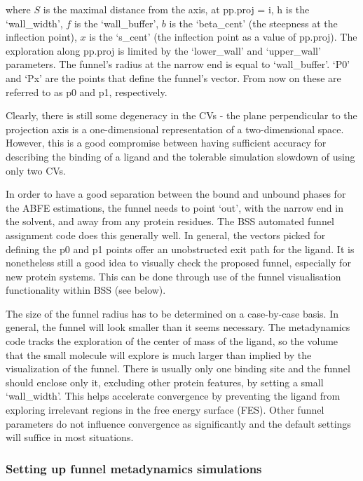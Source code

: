where $S$ is the maximal distance from the axis, at pp.proj = i, h is the
`wall\_width', $f$ is the `wall\_buffer', $b$ is the `beta\_cent' (the
steepness at the inflection point), $x$ is the `s\_cent' (the inflection
point as a value of pp.proj). The exploration along pp.proj is
limited by the `lower\_wall' and `upper\_wall' parameters. The funnel's
radius at the narrow end is equal to `wall\_buffer'. `P0' and `Px' are
the points that define the funnel's vector. From now on these are referred to
as p0 and p1, respectively.

Clearly, there is still some degeneracy in the CVs - the plane
perpendicular to the projection axis is a one-dimensional representation of a two-dimensional space. However, this is a good compromise between having sufficient accuracy for describing the binding of a
ligand and the tolerable simulation slowdown of using only two CVs.

In order to have a good separation between the bound and unbound phases for the ABFE estimations, the funnel needs to point `out', with the narrow end in the solvent,
and away from any protein residues. The BSS automated funnel assignment code does this generally well. In general, the vectors picked for defining the p0 and p1 points offer an unobstructed exit path for the ligand. It is nonetheless still a good idea to visually check the proposed funnel, especially for new protein systems. This can be done through use of the funnel visualisation functionality within BSS (see below).

The size of the funnel radius has to be determined on a case-by-case basis.
In general, the funnel will look smaller than it seems necessary. The metadynamics code tracks the exploration of the center of mass of the ligand, so the volume that the small molecule will explore is much larger than implied by the visualization of the funnel. There is usually only one binding site and the funnel should enclose only it, excluding other protein
features, by setting a small `wall\_width'. This helps accelerate convergence by preventing the ligand from exploring irrelevant
regions in the free energy surface (FES). Other funnel parameters do not influence convergence as significantly and the default settings will suffice in most situations.

\hypertarget{setupfunmetad}{%
\subsubsection{Setting up funnel metadynamics simulations}\label{setupfunmetad}}

